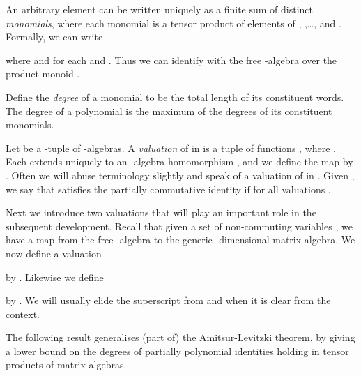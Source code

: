 \documentclass[runningheads]{llncs}
\begin{document}
An arbitrary element  can be written
uniquely as a finite sum of distinct \emph{monomials}, where each
monomial is a tensor product of elements of , ,\ldots,
and .  Formally, we can write

where  and  for each  and
.  Thus we can identify  with the free -algebra over the product monoid .

Define the \emph{degree} of a monomial  to be the total length  of its constituent
words.  The degree of a polynomial is the maximum of the degrees of
its constituent monomials.

Let  be a -tuple of -algebras.
A \emph{valuation} of  in
 is a tuple of functions
, where .
Each  extends uniquely to an -algebra homomorphism
, and we
define the map  by
.  Often we will abuse terminology slightly and speak
of a valuation of  in .  Given ,
we say that  satisfies the partially commutative
identity  if  for all valuations
.

Next we introduce two valuations that will play an important role in
the subsequent development.  Recall that given a set of non-commuting
variables , we have a map  from the free -algebra to the
generic -dimensional matrix algebra.  We now define a valuation

by .    Likewise we
define

by .
We will usually elide the superscript  from 
 and   when it is clear from the 
context.

The following result generalises (part of) the Amitsur-Levitzki
theorem, by giving a lower bound on the degrees of partially
polynomial identities holding in tensor products of matrix algebras.
\end{document}
